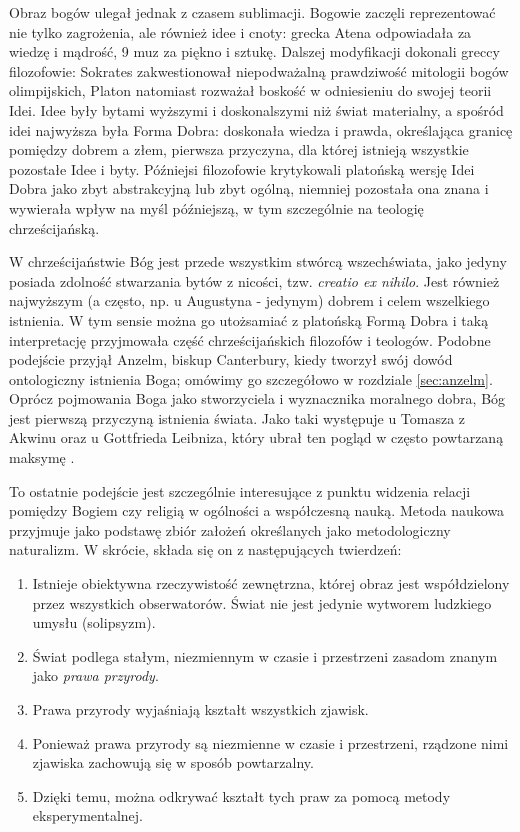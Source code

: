\documentclass{article}
\begin{document}
Obraz bogów ulegał jednak z czasem sublimacji. Bogowie zaczęli reprezentować nie tylko zagrożenia, ale również idee i cnoty: grecka Atena odpowiadała za wiedzę i mądrość, 9 muz za piękno i sztukę. Dalszej modyfikacji dokonali greccy filozofowie: Sokrates zakwestionował niepodważalną prawdziwość mitologii bogów olimpijskich, Platon natomiast rozważał boskość w odniesieniu do swojej teorii Idei. Idee były bytami wyższymi i doskonalszymi niż świat materialny, a spośród idei najwyższa była Forma Dobra: doskonała wiedza i prawda, określająca granicę pomiędzy dobrem a złem, pierwsza przyczyna, dla której istnieją wszystkie pozostałe Idee i byty. Późniejsi filozofowie krytykowali platońską wersję Idei Dobra jako zbyt abstrakcyjną lub zbyt ogólną, niemniej pozostała ona znana i wywierała wpływ na myśl późniejszą, w tym szczególnie na teologię chrześcijańską. 

W chrześcijaństwie Bóg jest przede wszystkim stwórcą wszechświata, jako jedyny posiada zdolność stwarzania bytów z nicości, tzw. \emph{creatio ex nihilo}. Jest również najwyższym (a często, np. u Augustyna - jedynym) dobrem i celem wszelkiego istnienia. W tym sensie można go utożsamiać z platońską Formą Dobra i taką interpretację przyjmowała część chrześcijańskich filozofów i teologów. Podobne podejście przyjął Anzelm, biskup Canterbury, kiedy tworzył swój dowód ontologiczny istnienia Boga; omówimy go szczegółowo w rozdziale \ref{sec:anzelm}. Oprócz pojmowania Boga jako stworzyciela i wyznacznika moralnego dobra, Bóg jest pierwszą przyczyną istnienia świata. Jako taki występuje u Tomasza z Akwinu oraz u Gottfrieda Leibniza, który ubrał ten pogląd w często powtarzaną maksymę . 

To ostatnie podejście jest szczególnie interesujące z punktu widzenia relacji pomiędzy Bogiem czy religią w ogólności a współczesną nauką. Metoda naukowa przyjmuje jako podstawę zbiór założeń określanych jako metodologiczny naturalizm. W skrócie, składa się on z następujących twierdzeń:

\begin{enumerate}
	\item \label{metodological:start} Istnieje obiektywna rzeczywistość zewnętrzna, której obraz jest współdzielony przez wszystkich obserwatorów. Świat nie jest jedynie wytworem ludzkiego umysłu (solipsyzm). 
	\item Świat podlega stałym, niezmiennym w czasie i przestrzeni zasadom znanym jako \emph{prawa przyrody}. 
	\item Prawa przyrody wyjaśniają kształt wszystkich zjawisk. 
	\item Ponieważ prawa przyrody są niezmienne w czasie i przestrzeni, rządzone nimi zjawiska zachowują się w sposób powtarzalny. 
	\item \label{metodological:end} Dzięki temu, można odkrywać kształt tych praw za pomocą metody eksperymentalnej. 
\end{enumerate}
\end{document}
